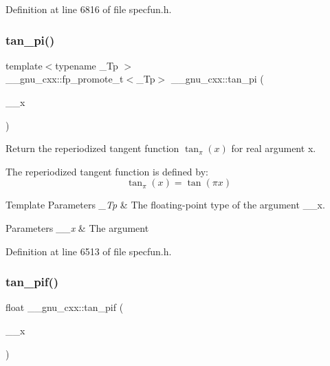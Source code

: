 Definition at line 6816 of file specfun.\+h.

\mbox{\label{group__mathsf__gnu_ga12855bd62fe6a955ef0d1d5e92c85ba9}} 
\subsubsection{\texorpdfstring{tan\+\_\+pi()}{tan\_pi()}}
{\footnotesize\ttfamily template$<$typename \+\_\+\+Tp $>$ \\
\+\_\+\+\_\+gnu\+\_\+cxx\+::fp\+\_\+promote\+\_\+t$<$\+\_\+\+Tp$>$ \+\_\+\+\_\+gnu\+\_\+cxx\+::tan\+\_\+pi (\begin{DoxyParamCaption}\item[{\+\_\+\+Tp}]{\+\_\+\+\_\+x }\end{DoxyParamCaption})\hspace{0.3cm}{\ttfamily [inline]}}

Return the reperiodized tangent function $ \tan_\pi(x) $ for real argument {\ttfamily x}.

The reperiodized tangent function is defined by\+: \[ \tan_\pi(x) = \tan(\pi x) \]


\begin{DoxyTemplParams}{Template Parameters}
{\em \+\_\+\+Tp} & The floating-\/point type of the argument {\ttfamily \+\_\+\+\_\+x}. \\
\hline
\end{DoxyTemplParams}

\begin{DoxyParams}{Parameters}
{\em \+\_\+\+\_\+x} & The argument \\
\hline
\end{DoxyParams}


Definition at line 6513 of file specfun.\+h.

\mbox{\label{group__mathsf__gnu_gaab32e2d76da811451e84232320ddf80c}} 
\subsubsection{\texorpdfstring{tan\+\_\+pif()}{tan\_pif()}}
{\footnotesize\ttfamily float \+\_\+\+\_\+gnu\+\_\+cxx\+::tan\+\_\+pif (\begin{DoxyParamCaption}\item[{float}]{\+\_\+\+\_\+x }\end{DoxyParamCaption})\hspace{0.3cm}{\ttfamily [inline]}}

